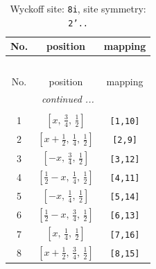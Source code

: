 \documentclass[fleqn,8pt]{jsarticle}
\begin{document}
\renewcommand{\arraystretch}{1.2}
\begin{longtable}{ccc}
\caption{Wyckoff site: {\tt 8i}, site symmetry: {\tt 2'..}}
 \\
 \hline \hline
No. & position & mapping \\ \hline \endfirsthead

\multicolumn{2}{l}{\tablename\ \thetable{}} \\
 \hline \hline
No. & position & mapping \\ \hline \endhead

 \hline \hline
\multicolumn{2}{r}{\footnotesize\it continued ...} \\ \endfoot

 \hline \hline
\multicolumn{2}{r}{} \\ \endlastfoot

1 & $\left[ x,\, \frac{3}{4},\, \frac{1}{2} \right]$ & {\tt [1,10]} \\ \hline
2 & $\left[ x + \frac{1}{2},\, \frac{1}{4},\, \frac{1}{2} \right]$ & {\tt [2,9]} \\ \hline
3 & $\left[ - x,\, \frac{3}{4},\, \frac{1}{2} \right]$ & {\tt [3,12]} \\ \hline
4 & $\left[ \frac{1}{2} - x,\, \frac{1}{4},\, \frac{1}{2} \right]$ & {\tt [4,11]} \\ \hline
5 & $\left[ - x,\, \frac{1}{4},\, \frac{1}{2} \right]$ & {\tt [5,14]} \\ \hline
6 & $\left[ \frac{1}{2} - x,\, \frac{3}{4},\, \frac{1}{2} \right]$ & {\tt [6,13]} \\ \hline
7 & $\left[ x,\, \frac{1}{4},\, \frac{1}{2} \right]$ & {\tt [7,16]} \\ \hline
8 & $\left[ x + \frac{1}{2},\, \frac{3}{4},\, \frac{1}{2} \right]$ & {\tt [8,15]} \\
\end{longtable}
\renewcommand{\arraystretch}{1.2}
\end{document}
